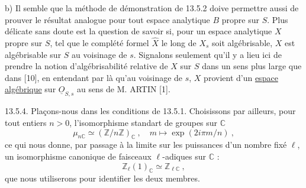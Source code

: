 b) Il semble que la méthode de démonstration de 13.5.2 doive permettre aussi de prouver le résultat analogue pour tout espace analytique $B$ propre sur $S$. Plus délicate sans doute est la question de savoir si, pour un espace analytique $X$ propre sur $S$, tel que le complété formel $\widehat X$ le long de $X_s$ soit algébrisable, $X$ est algébrisable sur $S$ au voisinage de $s$. Signalons seulement qu'il y a lieu ici de prendre la notion d'algébrisabilité relative de $X$ sur $S$ dans un sens plus large que dans [10], en entendant par là qu'au voisinage de $s$, $X$ provient d'un \uline{espace algébrique} sur $\underline O_{S,s}$ au sens de M. ARTIN [1].

13.5.4. Plaçons-nous dans les conditions de 13.5.1. Choisissons par ailleurs, pour tout entiers $n>0$, l'isomorphisme standart de groupes sur $\mathbb C$
\[
\mu_{n\mathbb C}\simeq(\mathbb Z/n\mathbb Z)_{\mathbb C}\ ,\quad m\longmapsto\exp(2i\pi m/n)\ ,
\]
ce qui nous donne, par passage à la limite sur les puissances d'un nombre fixé $\ell$, un isomorphisme canonique de faisceaux $\ell$-adiques sur $\mathbb C$ :
\[
\mathbb Z_\ell(1)_{\mathbb C}\simeq\mathbb Z_{\ell\mathbb C}\ ,
\]
que nous utiliserons pour identifier les deux membres.

